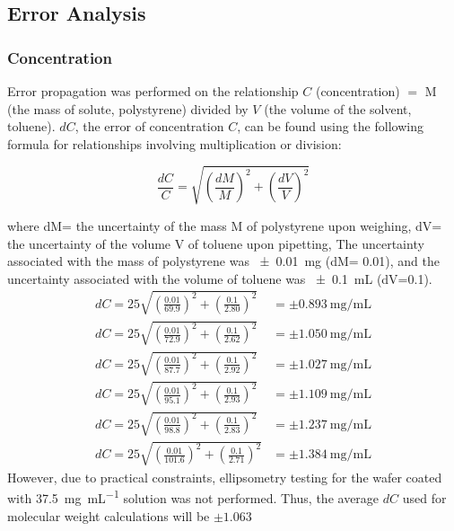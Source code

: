 \documentclass[twocolumn]{article}
\begin{document}
            \subsection{Error Analysis}
                \subsubsection{Concentration}
                Error propagation was performed on the relationship $C$ (concentration) $=$ M (the mass of solute, polystyrene) divided by $V$ (the volume of the solvent, toluene). $dC$, the error of concentration $C$, can be found using the following formula for relationships involving multiplication or division: 
                
                \begin{equation}
                    \frac{dC}{C} = \sqrt{(\frac{dM}{M})^2 + (\frac{dV}{V})^2}
                \end{equation}
                
                where dM= the uncertainty of the mass M of polystyrene upon weighing, dV= the uncertainty of the volume V of toluene upon pipetting, The uncertainty associated with the mass of polystyrene was \qty{\pm 0.01}{\milli\gram} (dM= 0.01), and the uncertainty associated with the volume of toluene was \qty{\pm 0.1}{\milli\liter} (dV=0.1). 
                    \begin{align}
                        dC = 25\sqrt{(\frac{0.01}{69.9})^2 + (\frac{0.1}{2.80})^2} &= \pm \qty{0.893}{\milli\gram\per\milli\liter}\\
                        dC = 25\sqrt{(\frac{0.01}{72.9})^2 + (\frac{0.1}{2.62})^2} &= \pm \qty{1.050}{\milli\gram\per\milli\liter}\\
                        dC = 25\sqrt{(\frac{0.01}{87.7})^2 + (\frac{0.1}{2.92})^2} &= \pm \qty{1.027}{\milli\gram\per\milli\liter}\\
                        dC = 25\sqrt{(\frac{0.01}{95.1})^2 + (\frac{0.1}{2.93})^2} &= \pm \qty{1.109}{\milli\gram\per\milli\liter}\\
                        dC = 25\sqrt{(\frac{0.01}{98.8})^2 + (\frac{0.1}{2.83})^2} &= \pm \qty{1.237}{\milli\gram\per\milli\liter}\\
                        dC = 25\sqrt{(\frac{0.01}{101.6})^2 + (\frac{0.1}{2.71})^2} &= \pm \qty{1.384}{\milli\gram\per\milli\liter}
                    \end{align}
                    However, due to practical constraints, ellipsometry testing for the wafer coated with \qty{37.5}{\milli\gram\per\milli\liter} solution was not performed. Thus, the average $dC$ used for molecular weight calculations will be $\pm 1.063$
\end{document}
